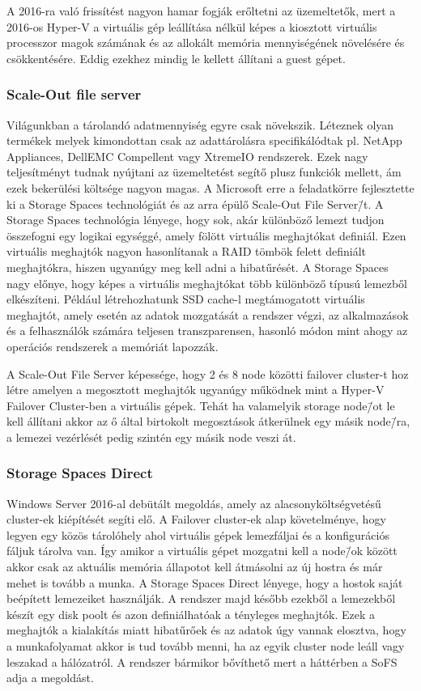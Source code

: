 \documentclass[12pt,oneside,justify,table]{book}
\begin{document}
A 2016-ra való frissítést nagyon hamar fogják erőltetni az üzemeltetők, mert a 2016-os Hyper-V a virtuális gép leállítása nélkül képes a kiosztott virtuális processzor magok számának és az allokált memória mennyiségének növelésére és csökkentésére. Eddig ezekhez mindig le kellett állítani a guest gépet. 

\subsubsection{Scale-Out file server}

Világunkban a tárolandó adatmennyiség egyre csak növekszik. Léteznek olyan termékek melyek kimondottan csak az adattárolásra specifikálódtak pl. NetApp Appliances, DellEMC Compellent vagy XtremeIO rendszerek. Ezek nagy teljesítményt tudnak nyújtani az üzemeltetést segítő plusz funkciók mellett, ám ezek bekerülési költsége nagyon magas.
A Microsoft erre a feladatkörre fejlesztette ki a Storage Spaces technológiát és az arra épülő Scale-Out File Server\=/t.
\newline
A Storage Spaces technológia lényege, hogy sok, akár különböző lemezt tudjon összefogni egy logikai egységgé, amely fölött virtuális meghajtókat definiál. Ezen virtuális meghajtók nagyon hasonlítanak a RAID tömbök felett definiált meghajtókra, hiszen ugyanúgy meg kell adni a hibatűrését.  A Storage Spaces nagy előnye, hogy képes a virtuális meghajtókat több különböző típusú lemezből elkészíteni. Például létrehozhatunk SSD cache-l megtámogatott virtuális meghajtót, amely esetén az adatok mozgatását a rendszer végzi, az alkalmazások és a felhasználók számára teljesen transzparensen, hasonló módon mint ahogy az operációs rendszerek a memóriát lapozzák.

A Scale-Out File Server képessége, hogy 2 és 8 node közötti failover cluster-t hoz létre amelyen a megosztott meghajtók ugyanúgy működnek mint a Hyper-V Failover Cluster-ben a virtuális gépek. Tehát ha valamelyik storage node\=/ot le kell állítani akkor az ő által birtokolt megosztások átkerülnek egy másik node\=/ra, a lemezei vezérlését pedig szintén egy másik node veszi át.

\subsubsection{Storage Spaces Direct}

Windows Server 2016-al debütált megoldás, amely az alacsonyköltségvetésű cluster-ek kiépítését segíti elő. A Failover cluster-ek alap követelménye, hogy legyen egy közös tárolóhely ahol virtuális gépek lemezfáljai és a konfigurációs fáljuk tárolva van. Így amikor a virtuális gépet mozgatni kell a node\=/ok között akkor csak az aktuális memória állapotot kell átmásolni az új hostra és már mehet is tovább a munka. 
A Storage Spaces Direct lényege, hogy a hostok saját beépített lemezeiket használják. A rendszer majd később ezekből a lemezekből készít egy disk poolt és azon definiálhatóak a tényleges meghajtók. Ezek a meghajtók a kialakítás miatt hibatűrőek és az adatok úgy vannak elosztva, hogy a munkafolyamat akkor is tud tovább menni, ha az egyik cluster node leáll vagy leszakad a hálózatról.
A rendszer bármikor bővíthető mert a háttérben a SoFS adja a megoldást.
\end{document}
